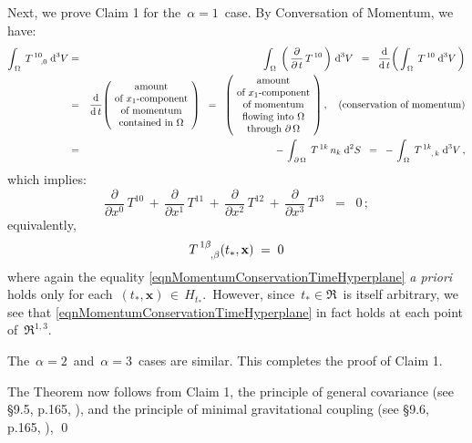 \vskip 0.2cm
\noindent
Next, we prove Claim 1 for the \,$\alpha = 1$\, case.
By {\color{red}Conversation of Momentum}, we have:
\begin{eqnarray*}
\int_{\,\Omega}\;T^{\,10}_{\,{\color{white}10},0}\;\d^{3}V
& = &
	\int_{\,\Omega}\;\left(\,\dfrac{\partial}{\partial\,t}\,T^{\,10}\,\right)\,\d^{3}V
\;\; = \;\;
	\dfrac{\d}{\d\,t}\!\left(\,\int_{\,\Omega}\;T^{\,10}\;\d^{3}V\,\right)
\\
&=&
\dfrac{\d}{\d\,t}\!\left(\!\begin{array}{c}
	\textnormal{amount}
	\\
	\textnormal{of $x_{1}$-component}
	\\
	\textnormal{of momentum}
	\\
	\textnormal{contained in $\Omega$}
	\end{array}\!\right)
\;\; = \;\;
	\left(\!\begin{array}{c}
		\textnormal{amount}
		\\
		\textnormal{of $x_{1}$-component}
		\\
		\textnormal{of momentum}
		\\
		\textnormal{flowing into $\Omega$}
		\\
		\textnormal{through $\partial\,\Omega$}
		\end{array}\!\right),
	\quad
	\textnormal{(conservation of momentum)}
\\
&=&
	-\,\int_{\,\partial\,\Omega}\;T^{\,1k}\,n_{k}\;\d^{2}S
\;\; = \;\;
	-\,\int_{\,\Omega}\;T^{\,1k}_{\;{\color{white}0k},\,k}\;\d^{3}V\,,
\end{eqnarray*}
which implies:
\begin{equation*}
\dfrac{\partial}{\partial x^{0}}\,T^{10}
\,+\,
\dfrac{\partial}{\partial x^{1}}\,T^{11}
\,+\,
\dfrac{\partial}{\partial x^{2}}\,T^{12}
\,+\,
\dfrac{\partial}{\partial x^{3}}\,T^{13}
\;\; = \;\;
0\,;
\end{equation*}
equivalently,
\begin{equation}\label{eqnMomentumConservationTimeHyperplane}
T^{\,1\beta}_{\;{\color{white}0\beta},\beta}(t_{*},\mathbf{x}) \; = \; 0
\end{equation}
where again the equality \eqref{eqnMomentumConservationTimeHyperplane}
\textit{a priori} holds only for each \,$(t_{*},\mathbf{x}) \,\in\, H_{t_{*}}$.\,
However, since \,$t_{*} \in \Re$\, is itself arbitrary, we see that 
\eqref{eqnMomentumConservationTimeHyperplane} in fact holds at each point of \,$\Re^{1,3}$.\,

\vskip 0.2cm
\noindent
The \,$\alpha = 2$\, and \,$\alpha = 3$\, cases are similar.
This completes the proof of Claim 1.

\vskip 0.3cm
\noindent
The Theorem now follows from Claim 1,
the {\color{red}principle of general covariance} (see \S9.5, p.165, \cite{dInverno2021}),
and the {\color{red}principle of minimal gravitational coupling} (see \S9.6, p.165, \cite{dInverno2021}),
\qed



